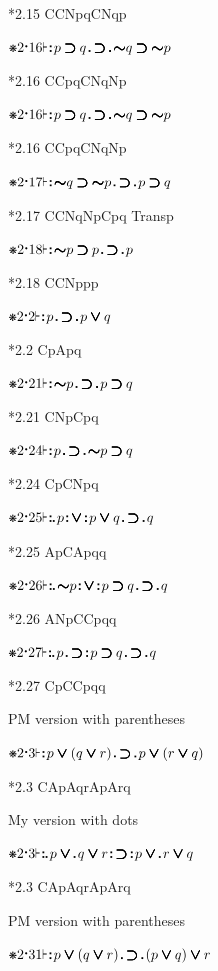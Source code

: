 \documentclass[12pt]{article}
\newcommand{\pmthm}{\mathpunct{\text{\scalebox{.5}[1]{$\boldsymbol\vdash$}}}} %
\newcommand{\pmast}{\text{\resizebox{!}{.75\height}{\ding{107}}}} %
\newcommand{\pmcdot}{\text{\raisebox{.05cm}{$\boldsymbol\cdot$}}} %
\newcommand{\pmd}{\hbox{\rule{.3ex}{.3ex}}} %
\newcommand{\pmdd}{\overset{\pmd}{\pmd}} %
\newcommand{\pmdot}{\mathinner{\pmd}}
\newcommand{\pmdott}{\mathinner{\pmdd}}
\newcommand{\pmdottt}{\mathinner{\pmdd\hspace{1pt}\pmd}}
\newcommand{\pmnot}{\mathord{\ooalign{$\boldsymbol{\sim}\mkern.5mu$\hidewidth\cr$\boldsymbol{\sim}$\cr\hidewidth$\mkern.5mu\boldsymbol{\sim}$}}}
\newcommand{\pmor}{\mathbin{\ooalign{$\boldsymbol{\vee}\mkern.5mu$\hidewidth\cr$\boldsymbol{\vee}$\cr\hidewidth$\mkern.5mu\boldsymbol{\vee}$}}}
\newcommand{\pmimp}{\mathbin{\ooalign{$\boldsymbol{\supset}\mkern.5mu$\hidewidth\cr$\boldsymbol{\supset}$\cr\hidewidth$\mkern.5mu\boldsymbol{\supset}$}}} %
\begin{document}
*2.15 CCNpqCNqp

$\pmast 2 \pmcdot 16 \pmthm \pmdott p \pmimp q \pmdot \pmimp \pmdot \pmnot q \pmimp \pmnot p $

*2.16 CCpqCNqNp

$\pmast 2 \pmcdot 16 \pmthm \pmdott p \pmimp q \pmdot \pmimp \pmdot \pmnot q \pmimp \pmnot p $

*2.16 CCpqCNqNp

$\pmast 2 \pmcdot 17 \pmthm \pmdott \pmnot q \pmimp \pmnot p \pmdot \pmimp \pmdot p \pmimp q $

*2.17 CCNqNpCpq Transp

$\pmast 2 \pmcdot 18 \pmthm \pmdott \pmnot p \pmimp p \pmdot \pmimp \pmdot p $

*2.18 CCNppp

$\pmast 2 \pmcdot 2 \pmthm \pmdott p \pmdot \pmimp \pmdot p \pmor q $

*2.2 CpApq

$\pmast 2 \pmcdot 21 \pmthm \pmdott \pmnot p \pmdot \pmimp \pmdot p \pmimp q $

*2.21 CNpCpq

$\pmast 2 \pmcdot 24 \pmthm \pmdott p \pmdot \pmimp \pmdot \pmnot p \pmimp q   $

*2.24 CpCNpq

$\pmast 2 \pmcdot 25 \pmthm \pmdottt p \pmdott \pmor \pmdott p \pmor q \pmdot \pmimp \pmdot q   $

*2.25 ApCApqq

$\pmast 2 \pmcdot 26 \pmthm \pmdottt \pmnot p \pmdott \pmor \pmdott p \pmimp q \pmdot \pmimp \pmdot q   $

*2.26 ANpCCpqq

$\pmast 2 \pmcdot 27 \pmthm \pmdottt p \pmdot \pmimp \pmdott p \pmimp q \pmdot \pmimp \pmdot q   $

*2.27 CpCCpqq

PM version with parentheses

$\pmast 2 \pmcdot 3 \pmthm \pmdott p \pmor ( q \pmor r ) \pmdot \pmimp \pmdot p \pmor ( r \pmor q )  $

*2.3 CApAqrApArq


My version with dots 

$\pmast 2 \pmcdot 3 \pmthm \pmdottt p \pmor \pmdot q \pmor r \pmdott \pmimp \pmdott p \pmor \pmdot r \pmor q   $

*2.3 CApAqrApArq

PM version with parentheses

$\pmast 2 \pmcdot 31 \pmthm \pmdott p \pmor ( q \pmor r ) \pmdot \pmimp \pmdot ( p \pmor q ) \pmor r  $
\end{document}
